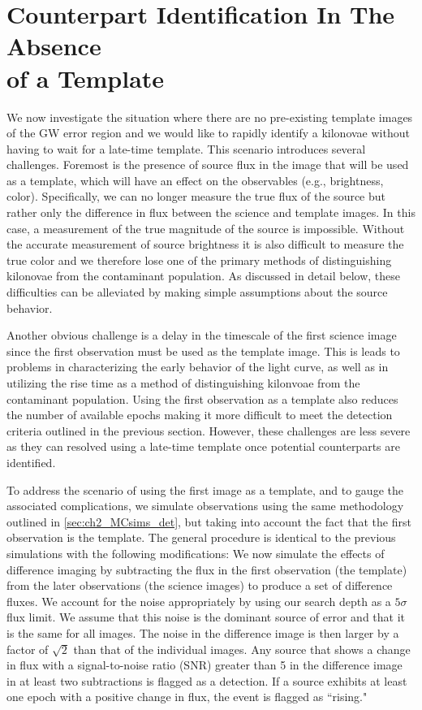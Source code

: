 \section{Counterpart Identification In The Absence\\ of a Template} 
\label{sec:ch2_diff}
We now investigate the situation where there are no pre-existing template images of the GW error region and we would like to rapidly identify a kilonovae without having to wait for a late-time template. This scenario introduces several challenges. Foremost is the presence of source flux in the image that will be used as a template, which will have an effect on the observables (e.g., brightness, color). Specifically, we can no longer measure the true flux of the source but rather only the difference in flux between the science and template images. In this case, a measurement of the true magnitude of the source is impossible. Without the accurate measurement of source brightness it is also difficult to measure the true color and we therefore lose one of the primary methods of distinguishing kilonovae from the contaminant population. As discussed in detail below, these difficulties can be alleviated by making simple assumptions about the source behavior. 

Another obvious challenge is a delay in the timescale of the first science image since the first observation must be used as the template image. This is leads to problems in characterizing  the early behavior of the light curve, as well as in utilizing the rise time as a method of distinguishing kilonvoae from the contaminant population. Using the first observation as a template also reduces the number of available epochs making it more difficult to meet the detection criteria outlined in the previous section. However, these challenges are less severe as they can resolved using a late-time template once potential counterparts are identified.

To address the scenario of using the first image as a template, and to gauge the associated complications, we simulate observations using the same methodology outlined in \cref{sec:ch2_MCsims_det}, but taking into account the fact that the first observation is the template. The general procedure is identical to the previous simulations with the following modifications: We now simulate the effects of difference imaging by subtracting the flux in the first observation (the template) from the later observations (the science images) to produce a set of difference fluxes. We account for the noise appropriately by using our search depth as a $5\sigma$ flux limit. We assume that this noise is the dominant source of error and that it is the same for all images. The noise in the difference image is then larger by a factor of $\sqrt{2}$ than that of the individual images. Any source that shows a change in flux with a signal-to-noise ratio (SNR) greater than 5 in the difference image in at least two subtractions is flagged as a detection. If a source exhibits at least one epoch with a positive change in flux, the event is flagged as ``rising."

